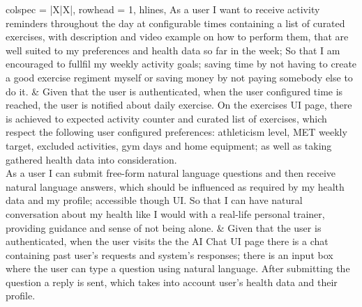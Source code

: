 \begin{center}
\begin{longtblr}[
            caption={User Stories},
            label={table:userStories}
        ] {
            colspec = {|X|X|},
            rowhead = 1,
            hlines,
        }
       As a user I want to receive activity reminders throughout the day at configurable times containing a list of curated exercises, with description and video example on how to perform them, that are well suited to my preferences and health data so far in the week; So that I am encouraged to fullfil my weekly activity goals; saving time by not having to create a good exercise regiment myself or saving money by not paying somebody else to do it.  
       &
       Given that the user is authenticated, when the user configured time is reached, the user is notified about daily exercise. On the exercises UI page, there is achieved to expected activity counter and curated list of exercises, which respect the following user configured preferences: athleticism level, MET weekly target, excluded activities, gym days and home equipment; as well as taking gathered health data into consideration.
       \\
       As a user I can submit free-form natural language questions and then receive natural language answers, which should be influenced as required by my health data and my profile; accessible though UI. So that I can have natural conversation about my health like I would with a real-life personal trainer, providing guidance and sense of not being alone.
       &
       Given that the user is authenticated, when the user visits the the AI Chat UI page there is a chat containing past user's requests and system's responses; there is an input box where the user can type a question using natural language. After submitting the question a reply is sent, which takes into account user's health data and their profile.

        \end{longtblr}
    \end{center}

